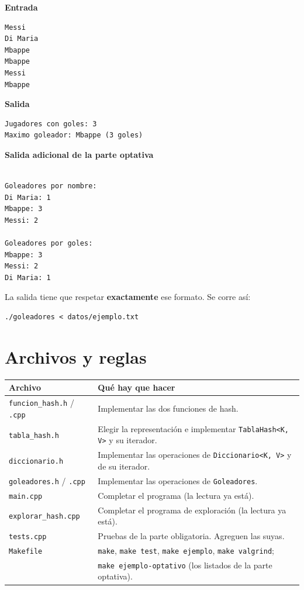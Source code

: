 \documentclass{article}
\begin{document}
\begin{minipage}[t]{0.3\textwidth}
\textbf{Entrada}
\begin{verbatim}
Messi
Di Maria
Mbappe
Mbappe
Messi
Mbappe
\end{verbatim}
\end{minipage}
\hfill
\begin{minipage}[t]{0.62\textwidth}
\textbf{Salida}
\begin{verbatim}
Jugadores con goles: 3
Maximo goleador: Mbappe (3 goles)
\end{verbatim}
\textbf{Salida adicional de la parte optativa}
\begin{verbatim}

Goleadores por nombre:
Di Maria: 1
Mbappe: 3
Messi: 2

Goleadores por goles:
Mbappe: 3
Messi: 2
Di Maria: 1
\end{verbatim}
\end{minipage}

La salida tiene que respetar \textbf{exactamente} ese formato. Se
corre así:

\begin{verbatim}
./goleadores < datos/ejemplo.txt
\end{verbatim}

\section{Archivos y reglas}

\begin{center}
\begin{tabular}{@{}ll@{}}
\toprule
Archivo & Qué hay que hacer \\
\midrule
\texttt{funcion\_hash.h} / \texttt{.cpp} & Implementar las dos funciones de hash. \\
\texttt{tabla\_hash.h} & Elegir la representación e implementar \texttt{TablaHash<K, V>} y su iterador. \\
\texttt{diccionario.h} & Implementar las operaciones de \texttt{Diccionario<K, V>} y de su iterador. \\
\texttt{goleadores.h} / \texttt{.cpp} & Implementar las operaciones de \texttt{Goleadores}. \\
\texttt{main.cpp} & Completar el programa (la lectura ya está). \\
\texttt{explorar\_hash.cpp} & Completar el programa de exploración (la lectura ya está). \\
\texttt{tests.cpp} & Pruebas de la parte obligatoria. Agreguen las suyas. \\
\texttt{Makefile} & \texttt{make}, \texttt{make test}, \texttt{make ejemplo}, \texttt{make valgrind}; \\
 & \texttt{make ejemplo-optativo} (los listados de la parte optativa). \\
\bottomrule
\end{tabular}
\end{center}
\end{document}

